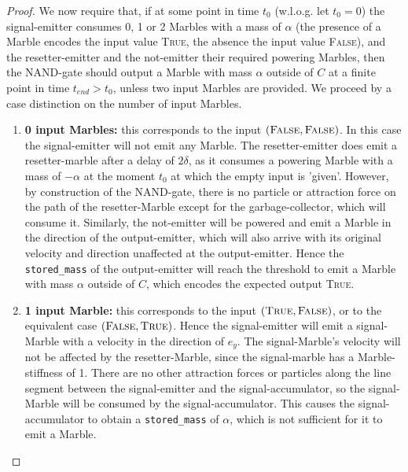 \begin{proof}
    We now require that, if at some point in time $t_0$ (w.l.o.g. let $t_0 = 0$) the signal-emitter consumes 0, 1 or 2 Marbles with a mass of $\alpha$ (the presence of a Marble encodes the input value \textsc{True}, the absence the input value \textsc{False}), and the resetter-emitter and the not-emitter their required powering Marbles, then the NAND-gate should output a Marble with mass $\alpha$ outside of $C$ at a finite point in time $t_{end} > t_0$, unless two input Marbles are provided. We proceed by a case distinction on the number of input Marbles.
    
    \begin{enumerate}
        \item \textbf{0 input Marbles:} this corresponds to the input $(\textsc{False}, \textsc{False})$. In this case the signal-emitter will not emit any Marble. The resetter-emitter does emit a resetter-marble after a delay of $2\delta$, as it consumes a powering Marble with a mass of $-\alpha$ at the moment $t_0$ at which the empty input is 'given'. However, by construction of the NAND-gate, there is no particle or attraction force on the path of the resetter-Marble except for the garbage-collector, which will consume it. Similarly, the not-emitter will be powered and emit a Marble in the direction of the output-emitter, which will also arrive with its original velocity and direction unaffected at the output-emitter. Hence the \texttt{stored\_mass} of the output-emitter will reach the threshold to emit a Marble with mass $\alpha$ outside of $C$, which encodes the expected output \textsc{True}.
        
        \item \textbf{1 input Marble:} this corresponds to the input $(\textsc{True}, \textsc{False})$, or to the equivalent case $(\textsc{False}, \textsc{True})$. Hence the signal-emitter will emit a signal-Marble with a velocity in the direction of $e_y$. The signal-Marble's velocity will not be affected by the resetter-Marble, since the signal-marble has a Marble-stiffness of 1. There are no other attraction forces or particles along the line segment between the signal-emitter and the signal-accumulator, so the signal-Marble will be consumed by the signal-accumulator. This causes the signal-accumulator to obtain a \texttt{stored\_mass} of $\alpha$, which is not sufficient for it to emit a Marble.
        

\end{enumerate}
\end{proof}
